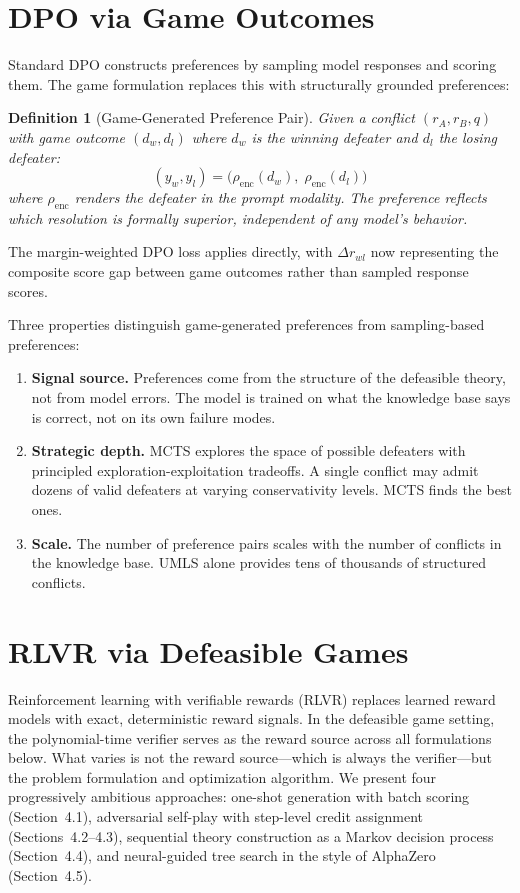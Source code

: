 \documentclass[11pt]{article}
\newtheorem{definition}{Definition}
\begin{document}
\section{DPO via Game Outcomes}

Standard DPO constructs preferences by sampling model responses and scoring them. The game formulation replaces this with structurally grounded preferences:

\begin{definition}[Game-Generated Preference Pair]
Given a conflict $(r_A, r_B, q)$ with game outcome $(d_w, d_l)$ where $d_w$ is the winning defeater and $d_l$ the losing defeater:
\[
    (y_w, y_l) = \bigl(\rho_{\mathrm{enc}}(d_w),\; \rho_{\mathrm{enc}}(d_l)\bigr)
\]
where $\rho_{\mathrm{enc}}$ renders the defeater in the prompt modality. The preference reflects which resolution is formally superior, independent of any model's behavior.
\end{definition}

The margin-weighted DPO loss applies directly, with $\Delta r_{wl}$ now representing the composite score gap between game outcomes rather than sampled response scores.

Three properties distinguish game-generated preferences from sampling-based preferences:

\begin{enumerate}[nosep]
    \item \textbf{Signal source.} Preferences come from the structure of the defeasible theory, not from model errors. The model is trained on what the knowledge base says is correct, not on its own failure modes.
    \item \textbf{Strategic depth.} MCTS explores the space of possible defeaters with principled exploration-exploitation tradeoffs. A single conflict may admit dozens of valid defeaters at varying conservativity levels. MCTS finds the best ones.
    \item \textbf{Scale.} The number of preference pairs scales with the number of conflicts in the knowledge base. UMLS alone provides tens of thousands of structured conflicts.
\end{enumerate}

\section{RLVR via Defeasible Games}

Reinforcement learning with verifiable rewards (RLVR) replaces learned reward models with exact, deterministic reward signals. In the defeasible game setting, the polynomial-time verifier serves as the reward source across all formulations below. What varies is not the reward source---which is always the verifier---but the problem formulation and optimization algorithm. We present four progressively ambitious approaches: one-shot generation with batch scoring (Section~4.1), adversarial self-play with step-level credit assignment (Sections~4.2--4.3), sequential theory construction as a Markov decision process (Section~4.4), and neural-guided tree search in the style of AlphaZero (Section~4.5).
\end{document}
